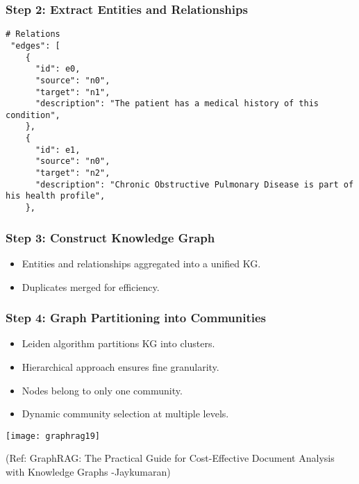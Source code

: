 \begin{frame}[fragile]\frametitle{Step 2: Extract Entities and Relationships}

    \begin{lstlisting}
# Relations
 "edges": [
    {
      "id": e0,
      "source": "n0",
      "target": "n1",
      "description": "The patient has a medical history of this condition",
    },
    {
      "id": e1,
      "source": "n0",
      "target": "n2",
      "description": "Chronic Obstructive Pulmonary Disease is part of his health profile",
    },
    \end{lstlisting}
\end{frame}


\begin{frame}[fragile]\frametitle{Step 3: Construct Knowledge Graph}
    \begin{itemize}
        \item Entities and relationships aggregated into a unified KG.
        \item Duplicates merged for efficiency.
    \end{itemize}
\end{frame}

\begin{frame}[fragile]\frametitle{Step 4: Graph Partitioning into Communities}
    \begin{itemize}
        \item Leiden algorithm partitions KG into clusters.
        \item Hierarchical approach ensures fine granularity.
        \item Nodes belong to only one community.
        \item Dynamic community selection at multiple levels.
    \end{itemize}
	
	\begin{center}
	\texttt{[image: graphrag19]}
	
	{\tiny (Ref: GraphRAG: The Practical Guide for Cost-Effective Document Analysis with Knowledge Graphs -Jaykumaran)}
	\end{center}	
\end{frame}

